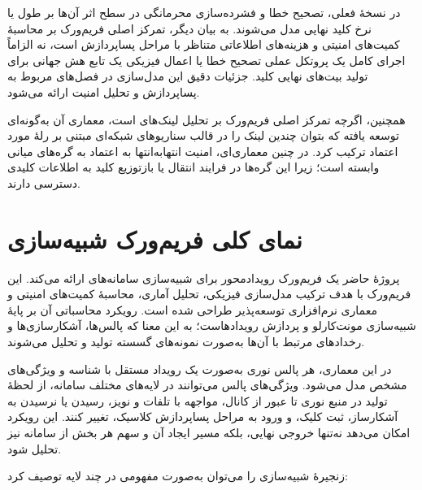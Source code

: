 در نسخهٔ فعلی، تصحیح خطا و فشرده‌سازی محرمانگی در سطح اثر آن‌ها بر طول یا نرخ کلید نهایی مدل می‌شوند. به بیان دیگر، تمرکز اصلی فریم‌ورک بر محاسبهٔ کمیت‌های امنیتی و هزینه‌های اطلاعاتی متناظر با مراحل پساپردازش است، نه الزاماً اجرای کامل یک پروتکل عملی تصحیح خطا یا اعمال فیزیکی یک تابع هش جهانی برای تولید بیت‌های نهایی کلید. جزئیات دقیق این مدل‌سازی در فصل‌های مربوط به پساپردازش و تحلیل امنیت ارائه می‌شود.

همچنین، اگرچه تمرکز اصلی فریم‌ورک بر تحلیل لینک‌های  است، معماری آن به‌گونه‌ای توسعه یافته که بتوان چندین لینک را در قالب سناریوهای شبکه‌ای مبتنی بر رلهٔ مورد اعتماد ترکیب کرد. در چنین معماری‌ای، امنیت انتهابه‌انتها به اعتماد به گره‌های میانی وابسته است؛ زیرا این گره‌ها در فرایند انتقال یا بازتوزیع کلید به اطلاعات کلیدی دسترسی دارند.

\section{نمای کلی فریم‌ورک شبیه‌سازی}

پروژهٔ حاضر یک فریم‌ورک رویدادمحور برای شبیه‌سازی سامانه‌های  ارائه می‌کند. این فریم‌ورک با هدف ترکیب مدل‌سازی فیزیکی، تحلیل آماری، محاسبهٔ کمیت‌های امنیتی و معماری نرم‌افزاری توسعه‌پذیر طراحی شده است. رویکرد محاسباتی آن بر پایهٔ شبیه‌سازی مونت‌کارلو و پردازش رویدادهاست؛ به این معنا که پالس‌ها، آشکارسازی‌ها و رخدادهای مرتبط با آن‌ها به‌صورت نمونه‌های گسسته تولید و تحلیل می‌شوند.

در این معماری، هر پالس نوری به‌صورت یک رویداد مستقل با شناسه و ویژگی‌های مشخص مدل می‌شود. ویژگی‌های پالس می‌توانند در لایه‌های مختلف سامانه، از لحظهٔ تولید در منبع نوری تا عبور از کانال، مواجهه با تلفات و نویز، رسیدن یا نرسیدن به آشکارساز، ثبت کلیک، و ورود به مراحل پساپردازش کلاسیک، تغییر کنند. این رویکرد امکان می‌دهد نه‌تنها خروجی نهایی، بلکه مسیر ایجاد آن و سهم هر بخش از سامانه نیز تحلیل شود.

زنجیرهٔ شبیه‌سازی را می‌توان به‌صورت مفهومی در چند لایه توصیف کرد:

